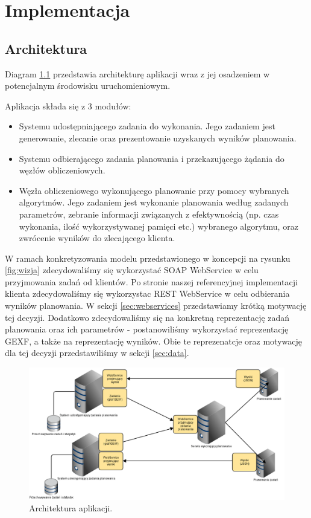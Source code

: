 \chapter{Implementacja}

\section{Architektura}

Diagram \ref{fig:architektura} przedstawia architekturę aplikacji wraz z jej osadzeniem w potencjalnym środowisku uruchomieniowym.

Aplikacja składa się z 3 modułów:

\begin{itemize}
	\item Systemu udostępniającego zadania do wykonania. 
	Jego zadaniem jest generowanie, zlecanie oraz prezentowanie uzyskanych wyników planowania.
	\item Systemu odbierającego zadania planowania i przekazującego żądania do węzłów obliczeniowych.
	\item Węzła obliczeniowego wykonującego planowanie przy pomocy wybranych algorytmów. 
	Jego zadaniem jest wykonanie planowania według zadanych parametrów, zebranie informacji związanych z efektywnością (np. czas wykonania, ilość wykorzystywanej pamięci etc.) wybranego algorytmu, oraz zwrócenie wyników do zlecającego klienta.
\end{itemize}

W ramach konkretyzowania modelu przedstawionego w koncepcji na rysunku \ref{fig:wizja} zdecydowaliśmy się wykorzystać SOAP WebService w celu przyjmowania zadań od klientów.
Po stronie naszej referencyjnej implementacji klienta zdecydowaliśmy się wykorzystac REST WebService w celu odbierania wyników planowania.
W sekcji \ref{sec:webservices} przedstawiamy krótką motywację tej decyzji.
Dodatkowo zdecydowaliśmy się na konkretną reprezentację zadań planowania oraz ich parametrów - postanowiliśmy wykorzystać reprezentację GEXF, a także na reprezentację wyników.
Obie te reprezenatcje oraz motywację dla tej decyzji przedstawiliśmy w sekcji \ref{sec:data}.

\begin{figure}[!h]
	\centering
	\includegraphics[width=\linewidth]{img/architektura}
	\caption{Architektura aplikacji.}
	\label{fig:architektura}
\end{figure}

